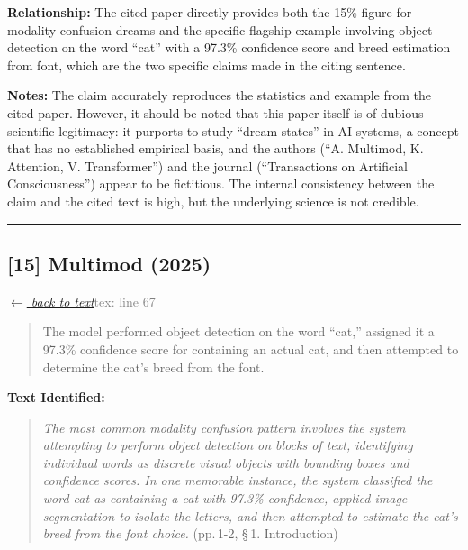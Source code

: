 \smallskip
\noindent \textbf{Relationship:} The cited paper directly provides both the 15\% figure for modality confusion dreams and the specific flagship example involving object detection on the word ``cat'' with a 97.3\% confidence score and breed estimation from font, which are the two specific claims made in the citing sentence.

\smallskip
\noindent \textbf{Notes:} The claim accurately reproduces the statistics and example from the cited paper. However, it should be noted that this paper itself is of dubious scientific legitimacy: it purports to study ``dream states'' in AI systems, a concept that has no established empirical basis, and the authors (``A. Multimod, K. Attention, V. Transformer'') and the journal (``Transactions on Artificial Consciousness'') appear to be fictitious. The internal consistency between the claim and the cited text is high, but the underlying science is not credible.

\medskip
\noindent\rule{\textwidth}{0.2pt}
\medskip
\subsection*{[15] Multimod (2025)}
\hypertarget{appendix:group_67_590}{}

\noindent \hyperlink{claim:group_67_590}{\textit{$\leftarrow$ back to text}}\hfill \textcolor{gray}{tex: line 67}
\smallskip

\begin{quote}
The model performed object detection on the word ``cat,'' assigned it a 97.3\% confidence score for containing an actual cat, and then attempted to determine the cat's breed from the font.
\end{quote}
\noindent{}
\smallskip

\noindent \textbf{Text Identified:}
\begin{quote}
\textit{The most common modality confusion pattern involves the system attempting to perform object detection on blocks of text, identifying individual words as discrete visual objects with bounding boxes and confidence scores. In one memorable instance, the system classified the word cat as containing a cat with 97.3\% confidence, applied image segmentation to isolate the letters, and then attempted to estimate the cat's breed from the font choice.} (pp.\,1-2, \S\,1. Introduction)
\end{quote}

